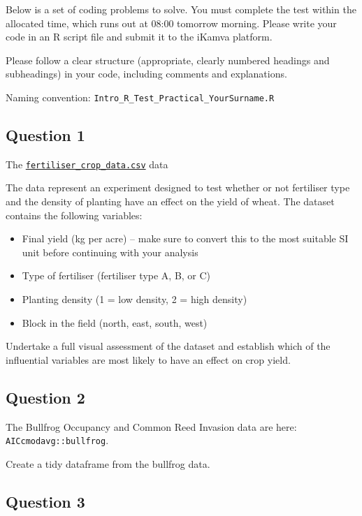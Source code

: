 \documentclass[
  10t,
]{article}
\providecommand{\tightlist}{%
  \setlength{\itemsep}{0pt}\setlength{\parskip}{0pt}}\usepackage{longtable,booktabs,array}
\begin{document}
Below is a set of coding problems to solve. You must complete the test
within the allocated time, which runs out at 08:00 tomorrow morning.
Please write your code in an R script file and submit it to the iKamva
platform.

Please follow a clear structure (appropriate, clearly numbered headings
and subheadings) in your code, including comments and explanations.

Naming convention: \texttt{Intro\_R\_Test\_Practical\_YourSurname.R}

\subsection{Question 1}\label{question-1-1}

The
\href{https://raw.githubusercontent.com/ajsmit/R_courses/main/static/data/fertiliser_crop_data.csv}{\texttt{fertiliser\_crop\_data.csv}}
data

The data represent an experiment designed to test whether or not
fertiliser type and the density of planting have an effect on the yield
of wheat. The dataset contains the following variables:

\begin{itemize}
\tightlist
\item
  Final yield (kg per acre) -- make sure to convert this to the most
  suitable SI unit before continuing with your analysis
\item
  Type of fertiliser (fertiliser type A, B, or C)
\item
  Planting density (1 = low density, 2 = high density)
\item
  Block in the field (north, east, south, west)
\end{itemize}

Undertake a full visual assessment of the dataset and establish which of
the influential variables are most likely to have an effect on crop
yield.

\subsection{Question 2}\label{question-2-1}

The Bullfrog Occupancy and Common Reed Invasion data are here:
\texttt{AICcmodavg::bullfrog}.

Create a tidy dataframe from the bullfrog data.

\subsection{Question 3}\label{question-3-1}
\end{document}
